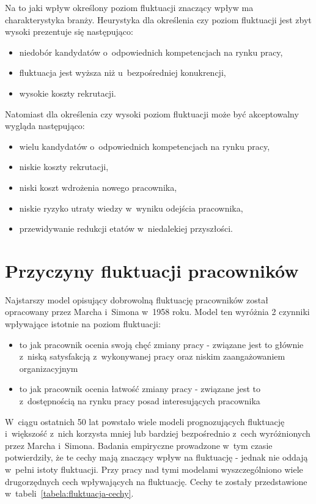 Na to jaki wpływ określony poziom fluktuacji znaczący wpływ ma charakterystyka branży.
Heurystyka dla określenia czy poziom fluktuacji jest zbyt wysoki prezentuje się następująco:
\begin{itemize}
    \item niedobór kandydatów o~odpowiednich kompetencjach na rynku pracy,
    \item fluktuacja jest wyższa niż u~bezpośredniej konukrencji,
    \item wysokie koszty rekrutacji.
\end{itemize}
Natomiast dla określenia czy wysoki poziom fluktuacji może być akceptowalny wygląda następująco:
\begin{itemize}
    \item wielu kandydatów o~odpowiednich kompetencjach na rynku pracy,
    \item niskie koszty rekrutacji,
    \item niski koszt wdrożenia nowego pracownika,
    \item niskie ryzyko utraty wiedzy w~wyniku odejścia pracownika,
    \item przewidywanie redukcji etatów w~niedalekiej przyszłości.
\end{itemize}


\section{Przyczyny fluktuacji pracowników}\label{sec:czynniki-wplywajace-na-fluktuacje}

Najstarszy model opisujący dobrowolną fluktuację pracowników został opracowany przez Marcha i~Simona w~1958 roku.
Model ten wyróżnia 2 czynniki wpływające istotnie na poziom fluktuacji:
\begin{itemize}
    \item to jak pracownik ocenia swoją chęć zmiany pracy - związane jest to głównie z~niską satysfakcją z~wykonywanej pracy oraz niskim zaangażowaniem organizacyjnym
    \item to jak pracownik ocenia łatwość zmiany pracy - związane jest to z~dostępnością na rynku pracy posad interesujących pracownika
\end{itemize}
W~ciągu ostatnich 50 lat powstało wiele modeli prognozujących fluktuację i~większość z~nich korzysta mniej lub bardziej bezpośrednio z~cech wyróżnionych przez Marcha i~Simona.
Badania empiryczne prowadzone w~tym czasie potwierdziły, że te cechy mają znaczący wpływ na fluktuację - jednak nie oddają w~pełni istoty fluktuacji.
Przy pracy nad tymi modelami wyszczególniono wiele drugorzędnych cech wpływających na fluktuację.
Cechy te zostały przedstawione w~tabeli~\ref{tabela:fluktuacja-cechy}.

